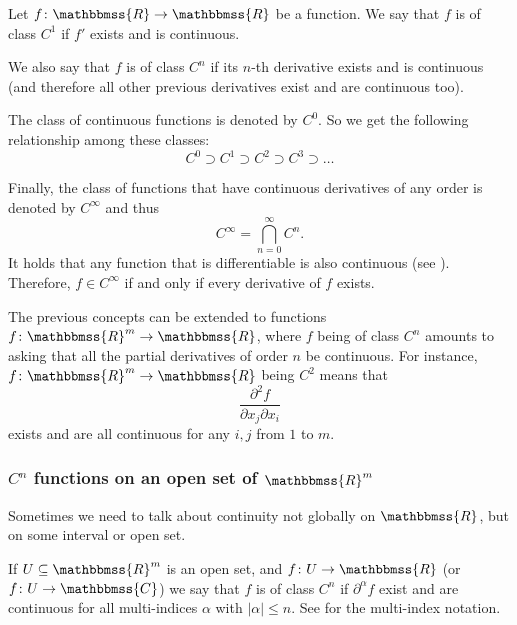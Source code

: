 \documentclass[12pt]{article}
\newcommand{\C}{\mathbbmss{C}}
\newcommand{\R}{\mathbbmss{R}}
\begin{document}
Let $f\colon \R\to\R$ be a function. We say that $f$ is of class $C^1$ if $f'$ exists and is continuous.

We also say that $f$ is of class $C^n$ if its $n$-th derivative exists and is continuous (and therefore all other previous derivatives exist and are continuous too).

The class of continuous functions is denoted by $C^0$. So we get the 
following relationship among these classes:
\[
C^0\supset C^1\supset C^2\supset C^3 \supset \ldots
\]

Finally, the class of functions that have continuous derivatives of any order is denoted by $C^\infty$ and thus
\[
C^\infty = \bigcap_{n=0}^\infty C^n.
\]
It holds that any function that is differentiable is also continuous
(see ). 
Therefore, $f\in C^\infty$ if and only if every derivative of $f$ exists.

The previous concepts can be extended to functions $f\colon \R^m \to \R$, 
where $f$ being of class $C^n$ amounts to asking that all the 
partial derivatives of order $n$ be continuous. 
For instance, $f\colon\R^m\to \R$ being $C^2$ means that
\[
\frac{\partial^2 f}{\partial x_j\partial x_i}
\]
exists and are all continuous for any $i,j$ from $1$ to $m$.

\subsubsection*{$C^n$ functions on an open set of $\R^m$}
Sometimes we need to talk about continuity not globally on $\R$, 
but on some interval or open set. 

If $U\subseteq \R^m$ is an open set, and $f\colon U\to \R$ 
(or $f\colon U\to \C$)
we say that $f$ is of class $C^n$ if $\partial^\alpha f$
exist and are continuous for all multi-indices $\alpha$ with $|\alpha|\le n$. 
See  for the multi-index notation.
\end{document}
